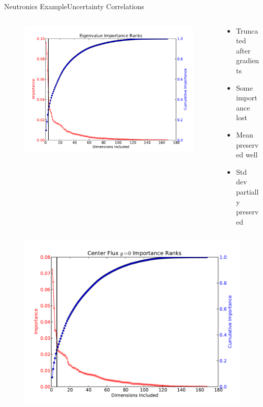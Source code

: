 \documentclass{beamer}
\begin{document}
\begin{frame}{Neutronics Example}{Uncertainty Correlations}\vspace{-20pt}
  \begin{columns}
    \begin{column}{0.5\textwidth}
      \begin{figure}
        \centering
        \includegraphics[width=0.8\linewidth]{c5g7/C5G7_eigenvalue_impranks}
      \end{figure}
    \end{column}
    \begin{column}{0.5\textwidth}
      \begin{itemize}
        \item Truncated after gradients
        \item Some importance lost
        \item Mean preserved well
        \item Std dev partially preserved
      \end{itemize}
    \end{column}
  \end{columns}
  \begin{columns}
    \begin{column}{0.5\textwidth}
      \begin{figure}
        \centering
        \includegraphics[width=0.8\linewidth]{c5g7/C5G7_center_flux_0_impranks}

\end{figure}
\end{column}
\end{columns}
\end{frame}
\end{document}
